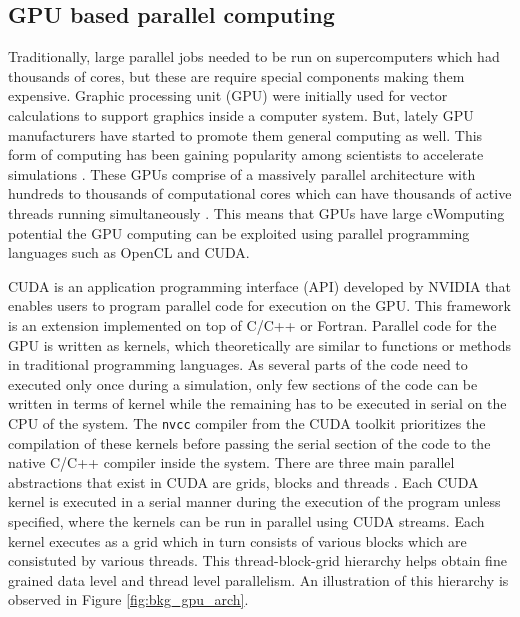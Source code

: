 \documentclass[preprint,10pt,authoryear,review]{elsarticle}
\begin{document}
\subsection{GPU based parallel computing}
Traditionally, large parallel jobs needed to be run on supercomputers which had thousands 
of cores, but these are require special components making them expensive.
Graphic processing unit (GPU) were initially used for vector calculations to support 
graphics inside a computer system. But, lately GPU manufacturers have started to promote them 
general computing as well. This form of computing has been gaining popularity among scientists 
to accelerate simulations \citep{kandrot2011}. These GPUs comprise of a 
massively parallel architecture with hundreds to thousands of computational cores 
which can have thousands of active threads running simultaneously \citep{keckler2011}. 
This means that GPUs have large cWomputing potential the GPU computing can be exploited using parallel programming languages 
such as OpenCL and CUDA. 

CUDA is an application programming interface (API) developed by NVIDIA \citep{NVIDIA2012} 
that enables users to program parallel code for execution on the GPU. This framework is an 
extension implemented on top of C/C++ or Fortran. Parallel code for the GPU is written 
as kernels, which theoretically are similar to functions or methods in traditional 
programming languages. As several parts of the code need to executed only once during a simulation, 
only few sections of the code can be written in terms of kernel while the remaining has 
to be executed in serial on the CPU of the system. The \texttt{nvcc} 
compiler from the CUDA toolkit prioritizes the compilation of these kernels before 
passing the serial section of the code to the native C/C++ compiler inside the system. 
There are three main parallel abstractions that exist in CUDA are grids, blocks and 
threads \citep{santos2013}. Each CUDA kernel is executed in a serial manner during the execution 
of the program unless specified, where the kernels can be run in parallel using CUDA 
streams. Each kernel executes as a grid which in turn consists of various blocks which 
are consistuted by various threads. This thread-block-grid hierarchy helps obtain fine 
grained data level and thread level parallelism. An illustration of this hierarchy is 
observed in Figure \ref{fig:bkg_gpu_arch}.
\end{document}
